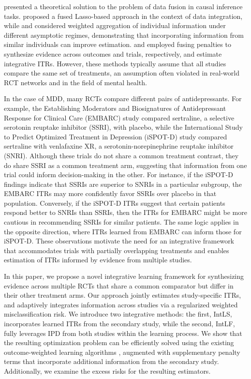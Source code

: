 \documentclass[12pt]{article}
\begin{document}
\citet{bareinboim2016causal} presented a theoretical solution to the problem of data fusion in causal inference tasks. \citet{tang2016fused} proposed a fused Lasso-based approach in the context of data integration, while \citet{shen2020fusion} and \citet{cai2023individualized} considered weighted aggregation of individual information under different asymptotic regimes, demonstrating that incorporating information from similar individuals can improve estimation. \citet{gao2024fusing} and \citet{qiu2024integrative} employed fusing penalties to synthesize evidence across outcomes and trials, respectively, and estimate integrative ITRs. However, these methods typically assume that all studies compare the same set of treatments, an assumption often violated in real-world RCT networks and in the field of mental health.

In the case of MDD, many RCTs compare different pairs of antidepressants. For example, the Establishing Moderators and Biosignatures of Antidepressant Response for Clinical Care (EMBARC) study \citep{trivedi2016establishing} compared sertraline, a selective serotonin reuptake inhibitor (SSRI), with placebo, while the International Study to Predict Optimized Treatment in Depression (iSPOT-D) study \citep{williams2011international} compared sertraline with venlafaxine XR, a serotonin-norepinephrine reuptake inhibitor (SNRI). Although these trials do not share a common treatment contrast, they do share SSRI as a common treatment arm, suggesting that information from one trial could inform decision-making in the other.  For instance, if the iSPOT-D findings indicate that SSRIs are superior to SNRIs in a particular subgroup, the EMBARC ITRs may more confidently favor SSRIs over placebo in that population.  Conversely, if the iSPOT-D ITRs suggest that certain patients respond better to SNRIs than SSRIs, then the ITRs for EMBARC might be more cautious in recommending SSRIs for similar patients. The same logic applies in the opposite direction, where ITRs learned from EMBARC can inform those for iSPOT-D. These observations motivate the need for an integrative framework that accommodates trials with partially overlapping treatments and enables estimation of ITRs informed by evidence from multiple studies.

In this paper, we propose a novel integrative learning framework for synthesizing evidence across multiple RCTs that share a common comparator but differ in their other treatment arms. Our approach jointly estimates study-specific ITRs, and adaptively integrates information across studies via a regularized weighted misclassification risk. We introduce two integrative methods: the first, IntLS, incorporates learned ITRs from the secondary study, while the second, IntLF, fully leverages IPD from both studies within the learning process. We show that the resulting optimization problem can be efficiently solved using the existing outcome-weighted learning algorithms \citep{liu2018augmented}, augmented with supplementary penalty terms that incorporate additional information from the secondary study. Additionally, we examine the excess risks for the resulting estimators. 
\end{document}
